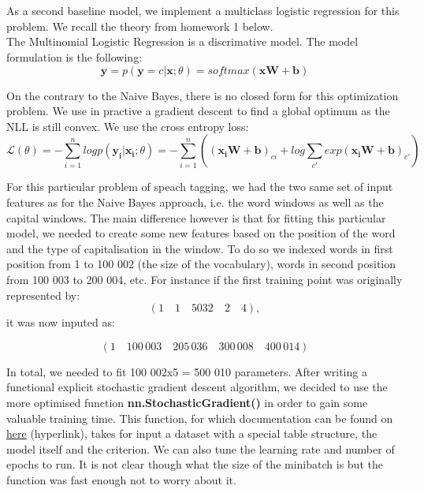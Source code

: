 \documentclass[11pt]{article}
\begin{document}
As a second baseline model, we implement a multiclass logistic regression for this problem. We recall the theory from homework 1 below.\\

\noindent The Multinomial Logistic Regression is a discrimative model. The model formulation is the following:
\[\mathbf{\hat{y}} = p(\mathbf{y} = c | \mathbf{x} ; \theta) = softmax(\mathbf{xW} + \mathbf{b}) \]

\noindent On the contrary to the Naive Bayes, there is no closed form for this optimization problem. We use in practive a gradient descent to find a global optimum as the NLL is still convex. We use the cross entropy loss:
\[ \mathcal{L}(\theta) = - \sum_{i=1}^{n} log p(\mathbf{y_i}| \mathbf{x_i}; \theta) = - \sum_{i=1}^{n} \left( (\mathbf{x_i W} + \mathbf{b})_{ci} + log \sum_{c'} exp(\mathbf{x_i W} + \mathbf{b})_{c'} \right) \]

\noindent For this particular problem of speach tagging, we had the two same set of input features as for the Naive Bayes approach, i.e. the word windows as well as the capital windows. The main difference however is that for fitting this particular model, we needed to create some new features based on the position of the word and the type of capitalisation in the window. To do so we indexed words in first position from 1 to 100 002 (the size of the vocabulary), words in second position from 100 003 to 200 004, etc. For instance if the first training point was originally represented by: 
$$ \left(1 \quad 1 \quad 5032 \quad 2 \quad 4\right),$$ \noindent it was now inputed as:

$$ \left(1 \quad 100\, 003 \quad 205\, 036 \quad 300\, 008 \quad 400\, 014\right)$$

\noindent In total, we needed to fit 100 002x5 = 500 010 parameters. After writing a functional explicit stochastic gradient descent algorithm, we decided to use the more optimised function \newline \textbf{nn.StochasticGradient()} in order to gain some valuable training time. This function, for which documentation can be found on \href{https://github.com/torch/nn/blob/master/doc/training.md}{here} (hyperlink), takes for input a dataset with a special table structure, the model itself and the criterion. We can also tune the learning rate and number of epochs to run. It is not clear though what the size of the minibatch is but the function was fast enough not to worry about it.\\
\end{document}

